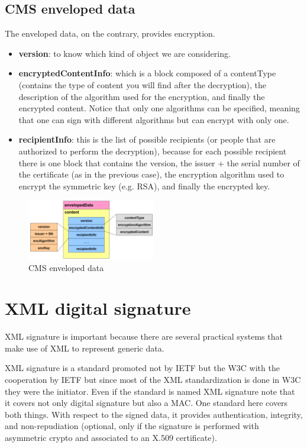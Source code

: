 \subsection{CMS enveloped data}
The enveloped data, on the contrary, provides encryption.
\begin{itemize}
  \item \textbf{version}: to know which kind of object we are
    considering.
  \item \textbf{encryptedContentInfo}: which is a block composed of a
    contentType (contains the type of content you will find after the
    decryption), the description of the algorithm used for the
    encryption, and finally the encrypted content. Notice that only
    one algorithms can be specified, meaning that one can sign with
    different algorithms but can encrypt with only one.
  \item \textbf{recipientInfo}: this is the list of possible
    recipients (or people that are authorized to perform the
    decryption), because for each possible recipient there is one
    block that contains the version, the issuer + the serial number of
    the certificate (as in the previous case), the encryption
    algorithm used to encrypt the symmetric key (e.g. RSA), and
    finally the encrypted key.
\end{itemize}

\begin{figure}[H]
  \centering
  \includegraphics[width=0.5\textwidth]{img/cms enveloped data.png}
  \caption{CMS enveloped data}
\end{figure}

\section{XML digital signature}

XML signature is important because there are several practical systems
that make use of XML to represent generic data.

XML signature is a standard promoted not by IETF but the W3C with the
cooperation by IETF but since most of the XML standardization is done
in W3C they were the initiator. Even if the standard is named XML
signature note that it covers not only digital signature but also a
MAC. One standard here covers both things. With respect to the signed
data, it provides authentication, integrity, and non-repudiation
(optional, only if the signature is performed with asymmetric crypto
and associated to an X.509 certificate).

